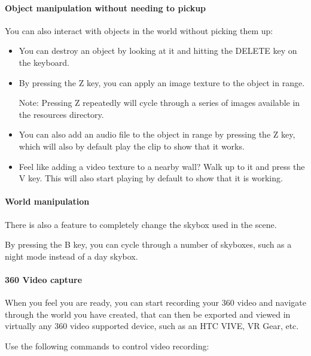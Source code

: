 \documentclass{article}
\begin{document}
			\paragraph{Object manipulation without needing to pickup}

			You can also interact with objects in the world without picking them up:

			\begin{itemize}

				\item You can destroy an object by looking at it and hitting the DELETE key on the keyboard.

				\item By pressing the Z key, you can apply an image texture to the object in range.

				Note: Pressing Z repeatedly will cycle through a series of images available in the resources directory.

				\item You can also add an audio file to the object in range by pressing the Z key, which will also by default play the clip to show that it works.

				\item Feel like adding a video texture to a nearby wall?  Walk up to it and press the V key.  This will also start playing by default to show that it is working.

			\end{itemize}

			\paragraph{World manipulation}

			There is also a feature to completely change the skybox used in the scene.

			By pressing the B key, you can cycle through a number of skyboxes, such as a night mode instead of a day skybox.


			\paragraph{360 Video capture}

			When you feel you are ready, you can start recording your 360 video and navigate through the world you have created, that can then be exported and viewed in virtually any 360 video supported device, such as an HTC VIVE, VR Gear, etc.

			Use the following commands to control video recording:
\end{document}
